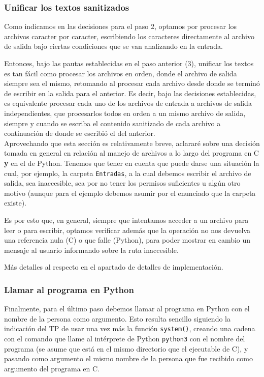 \documentclass[a4paper]{article}
\begin{document}
\subsubsection{Unificar los textos sanitizados}

Como indicamos en las decisiones para el paso 2, optamos por procesar los archivos caracter por caracter, escribiendo los caracteres directamente al archivo de salida bajo ciertas condiciones que se van analizando en la entrada.

Entonces, bajo las pautas establecidas en el paso anterior (3), unificar los textos es tan fácil como procesar los archivos en orden, donde el archivo de salida siempre sea el mismo, retomando al procesar cada archivo desde donde se terminó de escribir en la salida para el anterior. Es decir, bajo las decisiones establecidas, es equivalente procesar cada uno de los archivos de entrada a archivos de salida independientes, que procesarlos todos en orden a un mismo archivo de salida, siempre y cuando se escriba el contenido sanitizado de cada archivo a continuación de donde se escribió el del anterior.\\

Aprovechando que esta sección es relativamente breve, aclararé sobre una decisión tomada en general en relación al manejo de archivos a lo largo del programa en C \textbf{y} en el de Python. Tenemos que tener en cuenta que puede darse una situación la cual, por ejemplo, la carpeta \texttt{Entradas}, a la cual debemos escribir el archivo de salida, sea inaccesible, sea por no tener los permisos suficientes u algún otro motivo (aunque para el ejemplo debemos asumir por el enunciado que la carpeta existe).

Es por esto que, en general, siempre que intentamos acceder a un archivo para leer o para escribir, optamos verificar además que la operación no nos devuelva una referencia nula (C) o que falle (Python), para poder mostrar en cambio un mensaje al usuario informando sobre la ruta inaccesible.

Más detalles al respecto en el apartado de detalles de implementación.

\subsubsection{Llamar al programa en Python}

Finalmente, para el último paso debemos llamar al programa en Python con el nombre de la persona como argumento. Esto resulta sencillo siguiendo la indicación del TP de usar una vez más la función \texttt{system()}, creando una cadena con el comando que llame al intérprete de Python \texttt{python3} con el nombre del programa (se asume que está en el mismo directorio que el ejecutable de C), y pasando como argumento el mismo nombre de la persona que fue recibido como argumento del programa en C.
\end{document}
